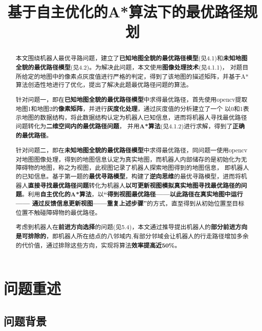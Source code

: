 \documentclass[withoutpreface,bwprint]{cumcmthesis} %
\title{基于自主优化的A*算法下的最优路径规划}
\begin{document}
 \maketitle
 \begin{abstract}
 
本文围绕机器人最优寻路问题，建立了\textbf{已知地图全貌的最优路径模型}(见4.1)和\textbf{未知地图全貌的最优路径模型}(见4.2)。为解决此问题，本文使用\textbf{图像处理技术}(见4.1.1)，
对题目所给定的地图中的像素点灰度值进行严格的判定，得到了该地图的描述矩阵，并基于A*算法创造性地进行了优化，提出了解决此题最优路径问题的算法。

针对问题一，即在\textbf{已知地图全貌的最优路径模型}中求得最优路径，首先使用opencv提取地图1和地图2的\textbf{像素矩阵}，并进行\textbf{灰度化处理}，通过灰度值的分析建立了一个
以0和1表示地图的数据结构，将此数据结构认定为机器人已知信息，进而将机器人寻找最优路径问题转化为\textbf{二维空间内的最优路径问题}，
并用\textbf{A*算法}(见4.1.2)进行求解，得到了\textbf{正确的最优路径}。

针对问题二，即在\textbf{未知地图全貌的最优路径模型}中求得最优路径，同问题一使用opencv对地图图像处理，得到的地图信息认定为真实地图，而机器人内部储存的是初始化为无障碍物的地图，称之为视图，此视图记录了机器人探索地图得到的地图信息，
即机器人的已知信息。基于第一题的\textbf{最优寻路模型}，构建了\textbf{逆向思维}的最优寻路模型，进而将机器人\textbf{直接寻找最优路径问题}转化为机器人\textbf{以可更新视图模拟真实地图寻找最优路径的问题}。利用\textbf{自主优化的A*算法}，以\textbf{“得到视图最优路径——以此路径在真实地图中运行——
通过反馈信息更新视图——重复上述步骤”}的方式，直至得到从初始位置至目标位置不触碰障碍物的最优路径。

考虑到机器人在\textbf{前进方向选择}的问题(见5.4)，本文通过推导提出机器人的\textbf{部分前进方向是可排除的}，即机器人所在结点的八邻域内,有部分邻域会让机器人的行走路径增加多余的代价值，通过排除这些方向，实现将算法\textbf{效率提高近50\%}。

\end{abstract}

\section{问题重述}

\subsection{问题背景}
\end{document}
